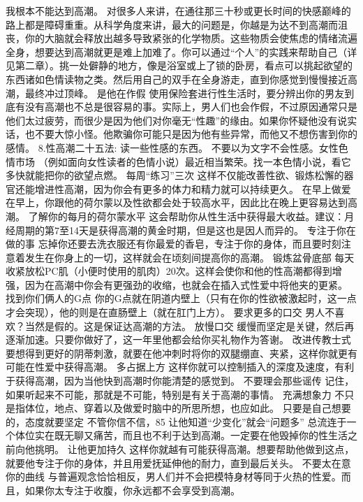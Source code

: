\documentclass[12pt,UTF8,openany]{ctexbook}
\begin{document}
我根本不能达到高潮。
对很多人来讲，在通往那三十秒或更长时间的快感巅峰的路上都是障碍重重。从科学角度来讲，最大的问题是，你越是为达不到高潮而沮丧，你的大脑就会释放出越多导致紧张的化学物质。这些物质会使焦虑的情绪流遍全身，想要达到高潮就更是难上加难了。你可以通过“个人”的实践来帮助自己（详见第二章）。挑一处僻静的地方，像是浴室或上了锁的卧房，看点可以挑起欲望的东西诸如色情读物之类。然后用自己的双手在全身游走，直到你感觉到慢慢接近高潮，最终冲过顶峰。
是他在作假
使用保险套进行性生活时，要分辨出你的男友到底有没有高潮也不总是很容易的事。实际上，男人们也会作假，不过原因通常只是他们太过疲劳，而很少是因为他们对你毫无“性趣”的缘由。如果你怀疑他没有说实话，也不要大惊小怪。他欺骗你可能只是因为他有些异常，而他又不想伤害到你的感情。
8.性高潮二十五法:
读一些性感的东西。
不要以为文字不会性感。女性色情市场 （例如面向女性读者的色情小说）最近相当繁荣。找一本色情小说，看它多快就能把你的欲望点燃。
每周“练习”三次
这样不仅能改善性欲、锻炼松懈的器官还能增进性高潮，因为你会有更多的体力和精力就可以持续更久。
在早上做爱
在早上，你跟他的荷尔蒙以及性欲都会处于较高水平，因此比在晚上更容易达到高潮。
了解你的每月的荷尔蒙水平
这会帮助你从性生活中获得最大收益。建议：月经周期的第7至14天是获得高潮的黄金时期，但是这也是因人而异的。
专注于你在做的事
忘掉你还要去洗衣服还有你最爱的香皂，专注于你的身体，而且要时刻注意着发生在你身上的一切，这样就会在顷刻间提高你的高潮。
锻炼盆骨底部
每天收紧放松PC肌（小便时使用的肌肉）20次。这样会使你和他的性高潮都得到增强，因为在高潮中你会有更强劲的收缩，也就会在插入式性爱中将他夹的更紧。
找到你们俩人的G点
你的G点就在阴道内壁上（只有在你的性欲被激起时，这一点才会突现），他的则是在直肠壁上（就在肛门上方）。
要求更多的口交
男人不喜欢？当然是假的。这是保证达高潮的方法。
放慢口交
缓慢而坚定是关键，然后再逐渐加速。只要你做好了，这一年里他都会给你买礼物作为答谢。
改进传教士式
要想得到更好的阴蒂刺激，就要在他冲刺时将你的双腿绷直、夹紧，这样你就更有可能在性爱中获得高潮。
多占据上方
这样你就可以控制插入的深度及速度，有利于获得高潮，因为当他快到高潮时你能清楚的感觉到。
不要理会那些谣传
记住，如果听起来不可能，那就是不可能，特别是有关于高潮的事情。
充满想象力
不只是指体位，地点、穿着以及做爱时脑中的所思所想，也应如此。
只要是自己想要的，态度就要坚定
不管你信不信，85%
让他知道“少变化”就会“问题多”
总流连于一个体位实在既无聊又痛苦，而且也不利于达到高潮。一定要在他毁掉你的性生活之前向他挑明。
让他更加持久
这样你就越有可能获得高潮。想要帮助他做到这点，就要他专注于你的身体，并且用爱抚延伸他的耐力，直到最后关头。
不要太在意你的曲线
与普遍观念恰恰相反，男人们并不会把模特身材等同于火热的性爱。而且，如果你太专注于收腹，你永远都不会享受到高潮。
\end{document}
